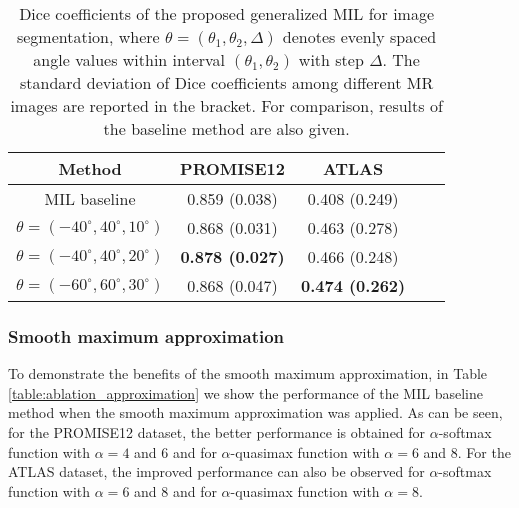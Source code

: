 \documentclass[runningheads]{llncs}
\begin{document}
\renewcommand\arraystretch{1.3}
\begin{table}
\caption{Dice coefficients of the proposed generalized MIL for image segmentation, where $\theta=(\theta_1,\theta_2,\Delta)$ denotes evenly spaced angle values within interval $(\theta_1,\theta_2)$ with step $\Delta$. The standard deviation of Dice coefficients among different MR images are reported in the bracket. For comparison, results of the baseline method are also given.}
\centering
\label{table}
\setlength{\tabcolsep}{5pt}
\begin{tabular}{ccccc}
\hline
\hline
Method & PROMISE12 & ATLAS \\
\hline
MIL baseline & 0.859 (0.038) & 0.408 (0.249) \\
$\theta=(-40^{\circ},40^{\circ},10^{\circ})$ & 0.868 (0.031) & 0.463 (0.278) \\
$\theta=(-40^{\circ},40^{\circ},20^{\circ})$ & \textbf{0.878 (0.027)} & 0.466 (0.248) \\
$\theta=(-60^{\circ},60^{\circ},30^{\circ})$ & 0.868 (0.047) & \textbf{0.474 (0.262)} \\
\hline
\hline
\end{tabular}
\label{table:ablation_mil}
\end{table}

\subsubsection{Smooth maximum approximation}
To demonstrate the benefits of the smooth maximum approximation, in Table \ref{table:ablation_approximation} we show the performance of the MIL baseline method when the smooth maximum approximation was applied. As can be seen, for the PROMISE12 dataset, the better performance is obtained for $\alpha$-softmax function with $\alpha=4$ and 6 and for $\alpha$-quasimax function with $\alpha=6$ and 8. For the ATLAS dataset, the improved performance can also be observed for $\alpha$-softmax function with $\alpha=6$ and 8 and for $\alpha$-quasimax function with $\alpha=8$.
\end{document}
